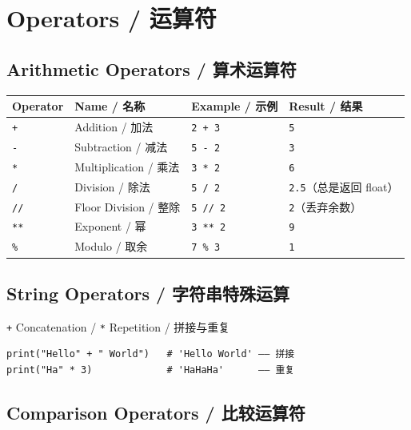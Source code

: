 \documentclass[11pt,a4paper]{report}
\let\oldtexttt\texttt
\renewcommand{\texttt}[1]{\textcolor{mainblue}{\oldtexttt{#1}}}
\begin{document}
\newpage

\chapter{Operators / 运算符}

\section{Arithmetic Operators / 算术运算符}

\medskip
\centering
\renewcommand{\arraystretch}{1.6}
\begin{tabular}{@{}llll@{}}
\toprule
\textbf{Operator} & \textbf{Name / 名称} & \textbf{Example / 示例} & \textbf{Result / 结果} \\ \midrule
\texttt{+}  & Addition / 加法      & \texttt{2 + 3}   & \texttt{5} \\
\texttt{-}  & Subtraction / 减法   & \texttt{5 - 2}   & \texttt{3} \\
\texttt{*}  & Multiplication / 乘法 & \texttt{3 * 2}   & \texttt{6} \\
\texttt{/}  & Division / 除法      & \texttt{5 / 2}   & \texttt{2.5}（总是返回 float） \\
\texttt{//} & Floor Division / 整除 & \texttt{5 // 2}  & \texttt{2}（丢弃余数） \\
\texttt{**} & Exponent / 幂      & \texttt{3 ** 2}   & \texttt{9} \\
\texttt{\%} & Modulo / 取余     & \texttt{7 \% 3}   & \texttt{1} \\ \bottomrule
\end{tabular}
\medskip

\section{String Operators / 字符串特殊运算}

\begin{concept}{\texttt{+} Concatenation / \texttt{*} Repetition / 拼接与重复}
\begin{lstlisting}
print("Hello" + " World")   # 'Hello World' —— 拼接
print("Ha" * 3)             # 'HaHaHa'      —— 重复
\end{lstlisting}
\end{concept}

\section{Comparison Operators / 比较运算符}
\end{document}
